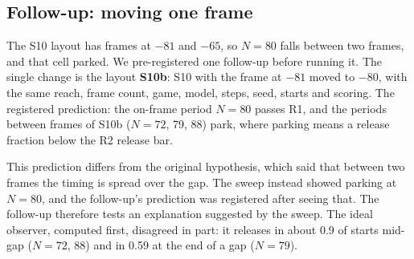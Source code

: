 \documentclass[11pt]{article}
\begin{document}
\subsection{Follow-up: moving one frame}
\label{sec:followup}
The S10 layout has frames at $-81$ and $-65$, so $N{=}80$ falls between two frames, and that cell parked. We
pre-registered one follow-up before running it. The single change is the layout \textbf{S10b}: S10 with the frame
at $-81$ moved to $-80$, with the same reach, frame count, game, model, steps, seed, starts and scoring. The
registered prediction: the on-frame period $N{=}80$ passes R1, and the periods between frames of S10b ($N{=}72$, 79,
88) park, where parking means a release fraction below the R2 release bar.

This prediction differs from the original hypothesis, which said that between two frames the timing is spread over the
gap. The sweep instead showed parking at $N{=}80$, and the follow-up's prediction was registered after seeing that.
The follow-up therefore tests an explanation suggested by the sweep. The ideal observer, computed first, disagreed
in part: it releases in about 0.9 of starts mid-gap ($N{=}72$, 88) and in 0.59 at the end of a gap ($N{=}79$).

\begin{table}[h]
\centering\small
{}
\caption{The follow-up: 60 test starts in 20 episodes per cell; brackets are 95\% bootstrap CIs over episodes.
Point estimates decide.}
\label{tab:followup}
\end{table}
\end{document}
